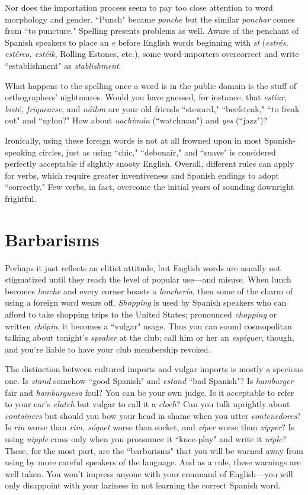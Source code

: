 Nor does the importation process seem to pay too close attention to word morphology and gender. ``Punch" became \emph{ponche} but the
similar \emph{ponchar} comes from ``to puncture." Spelling presents problems
as well. Aware of the penchant of Spanish speakers to place an \emph{e} before English words beginning with \emph{st} (\emph{estrés, estéreo, estéik}, Rolling
Estones, etc.), some word-importers overcorrect and write ``establishment" as \emph{stablishment}.

What happens to the spelling once a word is in the public
domain is the stuff of orthographers' nightmares. Would you have
guessed, for instance, that \emph{estíur, bisté, friquearse}, and \emph{náilon} are your
old friends ``steward," ``beefsteak," ``to freak out" and ``nylon?" How
about \emph{uachimán} (``watchman") and \emph{yes} (``jazz")?

Ironically, using these foreign words is not at all frowned upon
in most Spanish-speaking circles, just as using ``chic," ``debonair," and
``suave" is considered perfectly acceptable if slightly snooty English.
Overall, different rules can apply for verbs, which require greater inventiveness and Spanish endings to adopt ``correctly." Few verbs, in
fact, overcome the initial years of sounding downright frightful.

\section{Barbarisms}

Perhaps it just reflects an elitist attitude, but English words
are usually not stigmatized until they reach the level of popular
use---and misuse. When lunch becomes \emph{lonche} and every corner
boasts a \emph{lonchería}, then some of the charm of using a foreign word
wears off. \emph{Shopping} is used by Spanish speakers who can afford to take
shopping trips to the United States; pronounced \emph{chopping} or written
\emph{chópin}, it becomes a ``vulgar" usage. Thus you can sound cosmopolitan talking about tonight's \emph{speaker} at the club; call him or her an \emph{espíquer}, though, and you're liable to have your club membership revoked.

The distinction between cultured imports and vulgar imports is mostly a specious one. Is \emph{stand} somehow ``good Spanish" and
\emph{estand} ``bad Spanish"? Is \emph{hamburger} fair and \emph{hamburguesa} foul? You
can be your own judge. Is it acceptable to refer to your car's \emph{clutch} but
vulgar to call it a \emph{cloch}? Can you talk uprightly about \emph{containers} but
should you bow your head in shame when you utter \emph{contenedores}? Is
\emph{rin} worse than \emph{rim, sóquet} worse than socket, and \emph{zíper} worse than
\emph{zipper}? Is using \emph{nipple} crass only when you pronounce it ``knee-play"
and write it \emph{niple}? These, for the most part, are the ``barbarisms" that
you will be warned away from using by more careful speakers of the
language. And as a rule, these warnings are well taken. You won't impress anyone with your command of English---you will only disappoint
with your laziness in not learning the correct Spanish word.

